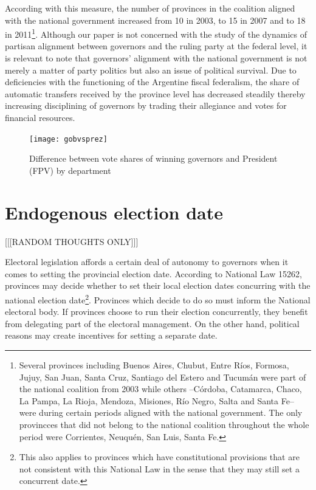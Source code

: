 \documentclass[a4paper,12pt]{article}
\begin{document}
According with this measure, the number of provinces in the coalition aligned with the national
government increased from 10 in 2003, to 15 in 2007 and to 18 in
2011\footnote{Several provinces including Buenos Aires, Chubut, Entre Ríos,
Formosa, Jujuy, San Juan, Santa Cruz, Santiago del Estero and Tucumán
were part of the national coalition from 2003 while others --Córdoba,
Catamarca, Chaco, La Pampa, La Rioja, Mendoza, Misiones, Río Negro,
Salta and Santa Fe-- were during certain periods aligned with the
national government. The only provincces that did not belong to the national
  coalition throughout the whole period were Corrientes, Neuquén, San Luis,
  Santa Fe.}. Although our paper is not concerned with the study of
the dynamics of partisan alignment between governors and the ruling
party at the federal level, it is relevant to note that governors'
alignment with the national government is not merely a matter of party
politics but also an issue of political survival. Due to deficiencies
with the functioning of the Argentine fiscal federalism, the share of
automatic transfers received by the province level has decreased
steadily thereby increasing disciplining of governors by trading their
allegiance and votes for financial resources.

\begin{landscape}
\begin{figure}[htbp]
  \centering
  \texttt{[image: gobvsprez]}
  \caption{Difference between vote shares of winning governors and
    President (FPV) by department}
\end{figure}
\end{landscape}

\section{Endogenous election date}  [[[RANDOM THOUGHTS ONLY]]]

Electoral legislation affords a certain deal of autonomy to governors
when it comes to setting the provincial election date. According to National Law
15262, provinces may decide whether to set their local election dates
concurring with the national election date\footnote{This also applies
  to provinces which have constitutional provisions that are not
  consistent with this National Law in the sense that they may still
  set a concurrent date.}.  Provinces which decide to
do so must inform the National electoral body. If provinces choose to
run their election concurrently, they benefit from delegating part of
the electoral management. On the other hand, political reasons may
create incentives for setting a separate date.
\end{document}
